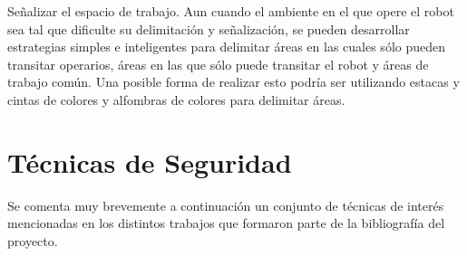 \documentclass[withindex,glossary]{cam-thesis}
\begin{document}
Señalizar el espacio de trabajo. Aun cuando el ambiente en el que opere el robot sea tal que dificulte su delimitación y señalización, se pueden desarrollar estrategias simples e inteligentes para delimitar áreas en las cuales sólo pueden transitar operarios, áreas en las que sólo puede transitar el robot y áreas de trabajo común. Una posible forma de realizar esto podría ser utilizando estacas y cintas de colores y alfombras de colores para delimitar áreas.

\section{Técnicas de Seguridad} \label{sec: Guía Seguridad :: Técnicas Seguridad}
Se comenta muy brevemente a continuación un conjunto de técnicas de interés mencionadas en los distintos trabajos que formaron parte de la bibliografía del proyecto.
\end{document}

